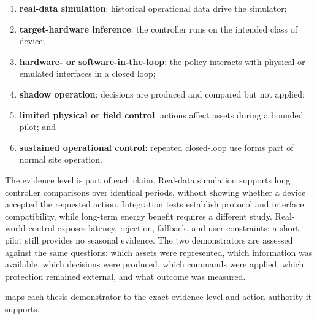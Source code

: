 \begin{enumerate}
  \item \textbf{real-data simulation}: historical operational data drive the simulator;
  \item \textbf{target-hardware inference}: the controller runs on the intended class of device;
  \item \textbf{hardware- or software-in-the-loop}: the policy interacts with physical or emulated interfaces in a closed loop;
  \item \textbf{shadow operation}: decisions are produced and compared but not applied;
  \item \textbf{limited physical or field control}: actions affect assets during a bounded pilot; and
  \item \textbf{sustained operational control}: repeated closed-loop use forms part of normal site operation.
\end{enumerate}

The evidence level is part of each claim. Real-data simulation supports long controller comparisons over identical periods, without showing whether a device accepted the requested action. Integration tests establish protocol and interface compatibility, while long-term energy benefit requires a different study. Real-world control exposes latency, rejection, fallback, and user constraints; a short pilot still provides no seasonal evidence. The two demonstrators are assessed against the same questions: which assets were represented, which information was available, which decisions were produced, which commands were applied, which protection remained external, and what outcome was measured.

 maps each thesis demonstrator to the exact evidence level and action authority it supports.


